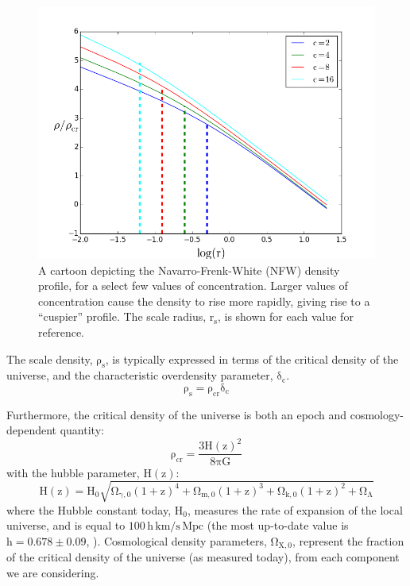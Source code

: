 \begin{figure}
  \centering
  \includegraphics[width=\textwidth]{images/Introduction/NFW_Cartoon.png}
  \caption[The NFW Profile]{A cartoon depicting the Navarro-Frenk-White (NFW) density profile, for a select few values of concentration. Larger values of concentration cause the density to rise more rapidly, giving rise to a ``cuspier'' profile. The scale radius, $\mathrm{r_{s}}$, is shown for each value for reference.}
\end{figure}

The scale density, $\mathrm{\rho_{s}}$, is typically expressed in terms of the critical density of the universe, and the characteristic overdensity parameter, $\mathrm{\delta_{c}}$.
\begin{equation}
\mathrm{\rho_{s} = \rho_{cr} \delta_{c}}
\end{equation}


Furthermore, the critical density of the universe is both an epoch and cosmology-dependent quantity:
\begin{equation}
\mathrm{\rho_{cr} = \frac{3H(z)^{2}}{8\pi G}}
\end{equation}
with the hubble parameter, $\mathrm{H(z)}$:
\begin{equation}
\mathrm{H(z) = H_{0} \sqrt{\Omega_{\gamma,0} (1+z)^{4} + \Omega_{m,0} (1+z)^{3} + \Omega_{k,0} (1+z)^{2} + \Omega_{\Lambda}}}
\end{equation}
where the Hubble constant today, $\mathrm{H_{0}}$, measures the rate of expansion of the local universe, and is equal to $\mathrm{100\, h\, km/s \, Mpc}$ (the most up-to-date value is $\mathrm{h=0.678 \pm 0.09}$, \citealt{Planck2015}). Cosmological density parameters, $\mathrm{\Omega_{X,0}}$, represent the fraction of the critical density of the universe (as measured today), from each component we are considering. 

